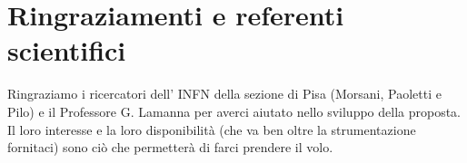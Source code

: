 \section*{Ringraziamenti e referenti scientifici}
Ringraziamo i ricercatori dell' INFN della sezione di Pisa (Morsani, Paoletti e Pilo) e il Professore G. Lamanna per averci aiutato nello sviluppo della proposta. Il loro interesse e la loro disponibilità (che va ben oltre la strumentazione fornitaci) sono ciò che permetterà di farci prendere il volo.  
